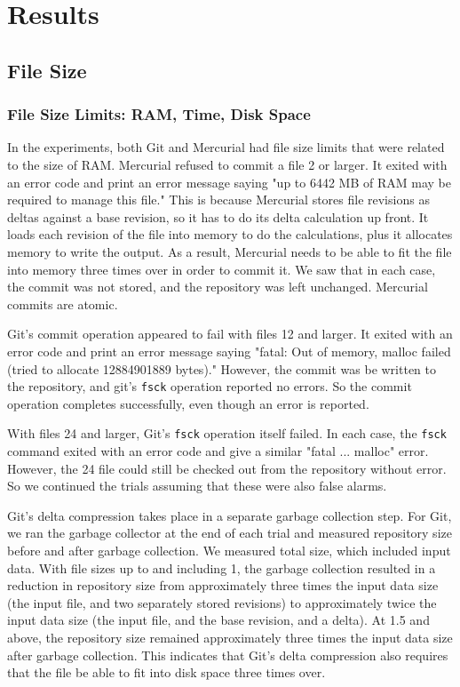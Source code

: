 \section{Results}

\subsection{File Size}

\subsubsection{File Size Limits: RAM, Time, Disk Space}

In the experiments, both Git and Mercurial had file size limits that were related to the size of RAM.
Mercurial refused to commit a file \SI{2}{\gib} or larger.
It exited with an error code and print an error message saying "up to 6442 MB of RAM may be required to manage this file."
This is because Mercurial stores file revisions as deltas against a base revision, so it has to do its delta calculation up front.
It loads each revision of the file into memory to do the calculations, plus it allocates memory to write the output.
As a result, Mercurial needs to be able to fit the file into memory three times over in order to commit it.
We saw that in each case, the commit was not stored, and the repository was left unchanged.
Mercurial commits are atomic.

Git's commit operation appeared to fail with files \SI{12}{\gib} and larger.
It exited with an error code and print an error message saying "fatal: Out of memory, malloc failed (tried to allocate 12884901889 bytes)."
However, the commit was be written to the repository, and git's \lstinline{fsck} operation reported no errors.
So the commit operation completes successfully, even though an error is reported.

With files \SI{24}{\gib} and larger, Git's \lstinline{fsck} operation itself failed.
In each case, the \lstinline{fsck} command exited with an error code and give a similar "fatal ... malloc" error.
However, the \SI{24}{\gib} file could still be checked out from the repository without error.
So we continued the trials assuming that these were also false alarms.

Git's delta compression takes place in a separate garbage collection step.
For Git, we ran the garbage collector at the end of each trial and measured repository size before and after garbage collection.
We measured total size, which included input data.
With file sizes up to and including \SI{1}{\gib}, the garbage collection resulted in a reduction in repository size from approximately three times the input data size (the input file, and two separately stored revisions) to approximately twice the input data size (the input file, and the base revision, and a delta).
At \SI{1.5}{\gib} and above, the repository size remained approximately three times the input data size after garbage collection.
This indicates that Git's delta compression also requires that the file be able to fit into disk space three times over.

